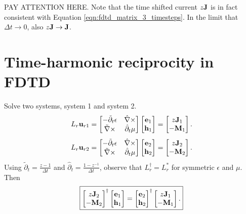 %
PAY ATTENTION HERE.  Note that the time shifted current $z \textbf{J}$ is in fact consistent with Equation \ref{eqn:fdtd_matrix_3_timesteps}.  In the limit that $\Delta t \to 0$, also $z \textbf{J} \to \textbf{J}$.



\section{Time-harmonic reciprocity in FDTD}

Solve two systems, system 1 and system 2.
%
\begin{equation}
L_r \textbf{u}_{r1} =
\begin{bmatrix}
-\tilde{\partial}_t \epsilon & \hat{\nabla}\times \\
\tilde{\nabla}\times & \hat{\partial}_t \mu
\end{bmatrix}
\begin{bmatrix} \textbf{e}_1 \\ \textbf{h}_1 \end{bmatrix}
=
\begin{bmatrix} z \textbf{J}_1 \\ -\textbf{M}_1 \end{bmatrix}.
\label{eqn:forwardSystem}
\end{equation}
%
\begin{equation}
L_r \textbf{u}_{r2} =
\begin{bmatrix}
-\tilde{\partial}_t \epsilon & \hat{\nabla}\times \\
\tilde{\nabla}\times & \hat{\partial}_t \mu
\end{bmatrix}
\begin{bmatrix} \textbf{e}_2 \\ \textbf{h}_2 \end{bmatrix}
=
\begin{bmatrix} z \textbf{J}_2 \\ -\textbf{M}_2 \end{bmatrix}.
\label{eqn:forwardSystem}
\end{equation}
%
Using $\tilde{\partial}_t = \frac{z - 1}{\Delta t}$ and $\hat{\partial}_t = \frac{1 - z^{-1}}{\Delta t}$, observe that $L_r^\dagger = L_r^\ast$ for symmetric $\epsilon$ and $\mu$.  Then
%
\begin{equation}
\boxed{
	\begin{bmatrix} z \ve{J}_2 \\ -\ve{M}_2 \end{bmatrix}^\dagger
	\begin{bmatrix} \ve{e}_1 \\ \ve{h}_1 \end{bmatrix}
	=
	\begin{bmatrix} \ve{e}_2 \\ \ve{h}_2 \end{bmatrix}^\dagger
	\begin{bmatrix} z \ve{J}_1 \\ -\ve{M}_1 \end{bmatrix}.
}%
\label{eqn:z_reciprocity}
\end{equation}
